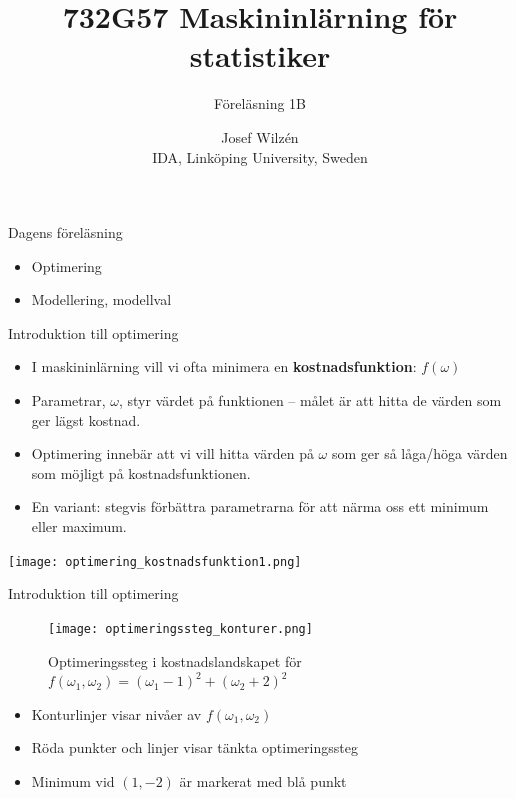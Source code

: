 \documentclass[10pt,english]{beamer}
\title{732G57 Maskininlärning för statistiker}
\subtitle{Föreläsning 1B}
\date{}
\author{Josef Wilzén \\ IDA, Linköping University, Sweden}
\begin{document}
\maketitle

\begin{frame}{Dagens föreläsning}
    \begin{itemize}
        \item Optimering 
        \item Modellering, modellval
    \end{itemize}
\end{frame}

\begin{frame}{Introduktion till optimering}
  \begin{itemize}
    \item I maskininlärning vill vi ofta minimera en \textbf{kostnadsfunktion}: $f\left(\omega\right)$
    \item Parametrar, $\omega$, styr värdet på funktionen  – målet är att hitta de värden som ger lägst kostnad.
    \item Optimering innebär att vi vill hitta värden på $\omega$ som ger så låga/höga värden som möjligt på kostnadsfunktionen.
    \item En variant: stegvis förbättra parametrarna för att närma oss ett minimum eller maximum.
  \end{itemize}

  \vspace{1em}
  \begin{center}
    \texttt{[image: optimering\_kostnadsfunktion1.png]}
  \end{center}
\end{frame}

\begin{frame}{Introduktion till optimering}
    \begin{figure}[htbp]
        \centering
        \texttt{[image: optimeringssteg\_konturer.png]}
        \caption*{Optimeringssteg i kostnadslandskapet för 
        $f(\omega_1, \omega_2) = (\omega_1 - 1)^2 + (\omega_2 + 2)^2$}
    \end{figure}
    \begin{itemize}
        \item Konturlinjer visar nivåer av $f(\omega_1, \omega_2)$
        \item Röda punkter och linjer visar tänkta optimeringssteg
        \item Minimum vid $(1, -2)$ är markerat med blå punkt
    \end{itemize}
\end{frame}
\end{document}
